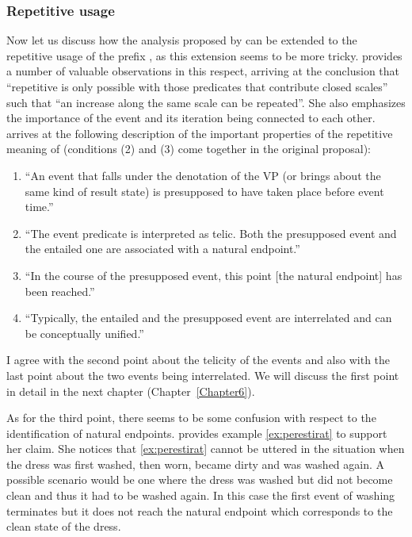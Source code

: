 \subsubsection{Repetitive usage}
Now let us discuss how the analysis proposed by \citet{Kagan:book} can be extended to the repetitive usage of the prefix , as this extension seems to be more tricky. \citet[149]{Kagan:book} provides a number of valuable observations in this respect, arriving at the conclusion that ``repetitive  is only possible with those predicates that contribute closed scales''
such that ``an increase along the same scale can be repeated''. She also emphasizes the importance of the event and its iteration being connected to each other. \citet[148]{Kagan:book} arrives at the following description of the important properties of the repetitive meaning of  (conditions (2) and (3) come together in the original proposal): 
\begin{enumerate}
\item ``An event that falls under the denotation of the VP (or brings about the same kind of result state) is presupposed to have taken place before event time.'' 
\item ``The event predicate is interpreted as telic. Both the presupposed event and the entailed one are associated with a natural endpoint.'' 
\item ``In the course of the presupposed event, this point [the natural endpoint] has been reached.''
\item ``Typically, the entailed and the presupposed event are interrelated and can be conceptually unified.''
\end{enumerate}

I agree with the second point about the telicity of the events and also with the last point about the two events being interrelated. We will discuss the first point in detail in the next chapter (Chapter~\ref{Chapter6}). 

As for the third point, there seems to be some confusion with respect to the identification of natural endpoints. \citet{Kagan:book} provides example \ref{ex:perestirat} to support her claim. She notices that \ref{ex:perestirat} cannot be uttered in the situation when the dress was first washed, then worn, became dirty and was washed again. A possible scenario would be one where the dress was washed but did not become clean and thus it had to be washed again. In this case the first event of washing terminates but it does not reach the natural endpoint which corresponds to the clean state of the dress.

